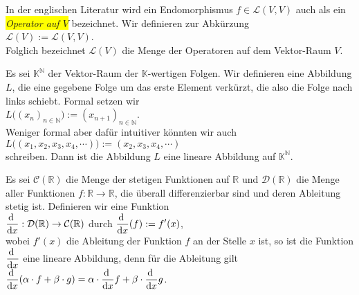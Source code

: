 In der englischen Literatur wird ein  Endomorphismus $f \in \mathcal{L}(V,V)$ auch als ein
\colorbox{yellow}{\emph{Operator auf $V$}} bezeichnet.  Wir definieren zur Abk\"{u}rzung
\\[0.2cm]
\hspace*{1.3cm}
$\mathcal{L}(V) := \mathcal{L}(V,V)$.
\\[0.2cm]
Folglich bezeichnet $\mathcal{L}(V)$ die Menge der Operatoren auf dem Vektor-Raum $V$.
\eoxs

\example
Es sei $\mathbb{K}^\mathbb{N}$ der Vektor-Raum der $\mathbb{K}$-wertigen Folgen.  Wir definieren
eine Abbildung $L$, die eine gegebene Folge um das erste Element verk\"{u}rzt, die also die Folge nach
links schiebt.  Formal setzen wir
\\[0.2cm]
\hspace*{1.3cm}
$L\bigl( (x_n)_{n\in \mathbb{N}} \bigr) := (x_{n+1})_{n\in\mathbb{N}}$.
\\[0.2cm]
Weniger formal aber daf\"{u}r intuitiver k\"{o}nnten wir auch
\\[0.2cm]
\hspace*{1.3cm}
$L\bigl( (x_1, x_2, x_3, x_4, \cdots) \bigr) := (x_2, x_3, x_4, \cdots)$
\\[0.2cm]
schreiben.  Dann ist die Abbildung $L$ eine lineare Abbildung auf $\mathbb{K}^\mathbb{N}$.
\eoxs

\example
Es sei $\mathcal{C}(\mathbb{R})$ die Menge der stetigen Funktionen auf $\mathbb{R}$ und $\mathcal{D}(\mathbb{R})$ die Menge aller Funktionen
$f:\mathbb{R} \rightarrow \mathbb{R}$, die \"{u}berall differenzierbar sind und deren Ableitung stetig ist.  Definieren wir eine Funktion
\\[0.2cm]
\hspace*{1.3cm}
$\displaystyle\frac{\mathrm{d}\;}{\mathrm{d}x}: \mathcal{D}(\mathbb{R}) \rightarrow \mathcal{C}(\mathbb{R})$ \quad durch $\displaystyle\frac{\mathrm{d}\;}{\mathrm{d}x}(f) := f'(x)$,
\\[0.2cm]
wobei $f'(x)$ die Ableitung der Funktion $f$ an der Stelle $x$ ist, so ist die Funktion $\displaystyle\frac{\mathrm{d}\;}{\mathrm{d}x}$ eine lineare Abbildung,
denn f\"{u}r die Ableitung gilt
\\[0.2cm]
\hspace*{1.3cm}
$\displaystyle\frac{\mathrm{d}\;}{\mathrm{d}x} (\alpha \cdot f + \beta \cdot g) = \alpha \cdot \frac{\mathrm{d}\;}{\mathrm{d}x} f + \beta \cdot \frac{\mathrm{d}\;}{\mathrm{d}x} g$. \eoxs


